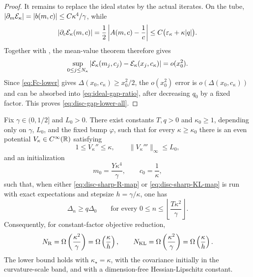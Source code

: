 \begin{proof}
It remains to replace the ideal states by the actual iterates.  On the tube,
$|\partial_m\mathcal{E}_\kappa|=|b(m,c)|\leq C\kappa^4/\gamma$, while
\[
    \left|\partial_c\mathcal{E}_\kappa(m,c)\right|
    =\frac12\left|A(m,c)-\frac1c\right|
    \leq C\bigl(\varepsilon_\kappa+\kappa|q|\bigr).
\]
Together with , the mean-value theorem therefore gives
\begin{equation}
\label{eq:objective-shadow}
    \sup_{0\leq j\leq N_\kappa}
    \left|
        \mathcal{E}_\kappa(m_j,c_j)-\mathcal{E}_\kappa(x_j,c_\kappa)
    \right|
    =o(x_0^2).
\end{equation}
Since \eqref{eq:Fc-lower} gives
$\Delta(x_0,c_\kappa)\geq x_0^2/2$, the $o(x_0^2)$ error is
$o(\Delta(x_0,c_\kappa))$ and can be absorbed into
\eqref{eq:ideal-gap-ratio}, after decreasing $q_0$ by a fixed factor.  This proves
\eqref{eq:disc-gap-lower-all}.
\end{proof}

\begin{theorem}
\label{thm:disc-global-sharp}
Fix $\gamma\in(0,1/2]$ and $L_0>0$.  There exist constants
$T,q>0$ and $\kappa_0\geq1$, depending only on $\gamma$, $L_0$, and the fixed bump
$\varphi$, such that for every $\kappa\geq\kappa_0$ there is an even potential
$V_\kappa\in C^\infty(\mathbb{R})$ satisfying
\begin{equation}
\label{eq:disc-sharp-final-assumptions}
    1\leq V_\kappa''\leq\kappa,
    \qquad
    \|V_\kappa'''\|_\infty\leq L_0,
\end{equation}
and an initialization
\begin{equation}
\label{eq:disc-sharp-final-init}
    m_0=\frac{Y\kappa^4}{\gamma},
    \qquad
    c_0=\frac1\kappa,
\end{equation}
such that, when either \eqref{eq:disc-sharp-R-map} or
\eqref{eq:disc-sharp-KL-map} is run with exact expectations and stepsize
$h=\gamma/\kappa$, one has
\begin{equation}
\label{eq:disc-sharp-final-gap}
    \Delta_n\geq q\Delta_0
    \qquad
    \text{for every }
    0\leq n\leq
    \left\lfloor\frac{T\kappa^2}{\gamma}\right\rfloor.
\end{equation}
Consequently, for constant-factor objective reduction,
\begin{equation}
\label{eq:disc-sharp-final-complexity}
    N_{\mathrm{R}}=\Omega\left(\frac{\kappa^2}{\gamma}\right)
    =\Omega\left(\frac{\kappa}{h}\right),
    \qquad
    N_{\mathrm{KL}}=\Omega\left(\frac{\kappa^2}{\gamma}\right)
    =\Omega\left(\frac{\kappa}{h}\right).
\end{equation}
The lower bound holds with $\kappa_\star=\kappa$, with the covariance initially in the
curvature-scale band, and with a dimension-free Hessian-Lipschitz constant.
\end{theorem}

